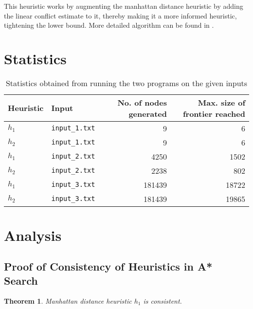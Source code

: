 \documentclass[11pt, a4paper]{article}
\newtheorem{theorem}{Theorem}
\theoremstyle{definition}
\begin{document}
This heuristic works by augmenting the manhattan distance heuristic by adding the linear conflict estimate to it, thereby making it a more informed heuristic, tightening the lower bound. More detailed algorithm can be found in .

\section{Statistics}
\begin{table}[!htb]
  \caption{Statistics obtained from running the two programs on the given inputs}
  \centering
  \begin{tabular}{l|l|r|r}
    \textbf{Heuristic} & \textbf{Input}        & \textbf{No. of nodes generated} & \textbf{Max. size of frontier reached} \\ \hline
    $h_1$              & \texttt{input\_1.txt} & 9                               & 6                                      \\
    $h_2$              & \texttt{input\_1.txt} & 9                               & 6                                      \\ \hline
    $h_1$              & \texttt{input\_2.txt} & 4250                            & 1502                                   \\
    $h_2$              & \texttt{input\_2.txt} & 2238                            & 802                                    \\ \hline

    $h_1$              & \texttt{input\_3.txt} & 181439                          & 18722                                  \\
    $h_2$              & \texttt{input\_3.txt} & 181439                          & 19865
  \end{tabular}
\end{table}

\section{Analysis}
\subsection{Proof of Consistency of Heuristics in A* Search}
\begin{theorem}
  Manhattan distance heuristic $h_1$ is consistent.
\end{theorem}
\end{document}
